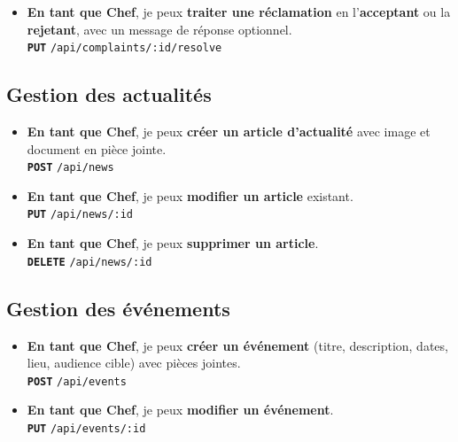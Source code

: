 \documentclass[12pt,a4paper]{article}
\newcommand{\route}[1]{\texorpdfstring{\texttt{\small\color{routeGray}#1}}{#1}}
\newcommand{\httpmethod}[1]{%
  \ifstrequal{#1}{GET}{\colorbox{blue!15}{\texttt{\bfseries\color{blue!70!black}GET}}}{}%
  \ifstrequal{#1}{POST}{\colorbox{green!18}{\texttt{\bfseries\color{green!60!black}POST}}}{}%
  \ifstrequal{#1}{PUT}{\colorbox{orange!18}{\texttt{\bfseries\color{orange!70!black}PUT}}}{}%
  \ifstrequal{#1}{DELETE}{\colorbox{red!15}{\texttt{\bfseries\color{red!70!black}DELETE}}}{}%
}
\newcommand{\usmark}{\color{accentGold}$\blacktriangleright$\;}
\begin{document}
\begin{chefbox}
\begin{itemize}[leftmargin=1.2cm, labelsep=0.4cm]
  \item[\usmark] \textbf{En tant que Chef}, je peux \textbf{traiter une réclamation} en l'\textbf{acceptant} ou la \textbf{rejetant}, avec un message de réponse optionnel.\\
    \httpmethod{PUT} \route{/api/complaints/:id/resolve}
\end{itemize}

\subsection*{Gestion des actualités}

\begin{itemize}[leftmargin=1.2cm, labelsep=0.4cm]
  \item[\usmark] \textbf{En tant que Chef}, je peux \textbf{créer un article d'actualité} avec image et document en pièce jointe.\\
    \httpmethod{POST} \route{/api/news}

  \item[\usmark] \textbf{En tant que Chef}, je peux \textbf{modifier un article} existant.\\
    \httpmethod{PUT} \route{/api/news/:id}

  \item[\usmark] \textbf{En tant que Chef}, je peux \textbf{supprimer un article}.\\
    \httpmethod{DELETE} \route{/api/news/:id}
\end{itemize}

\subsection*{Gestion des événements}

\begin{itemize}[leftmargin=1.2cm, labelsep=0.4cm]
  \item[\usmark] \textbf{En tant que Chef}, je peux \textbf{créer un événement} (titre, description, dates, lieu, audience cible) avec pièces jointes.\\
    \httpmethod{POST} \route{/api/events}

  \item[\usmark] \textbf{En tant que Chef}, je peux \textbf{modifier un événement}.\\
    \httpmethod{PUT} \route{/api/events/:id}


\end{itemize}
\end{chefbox}
\end{document}

